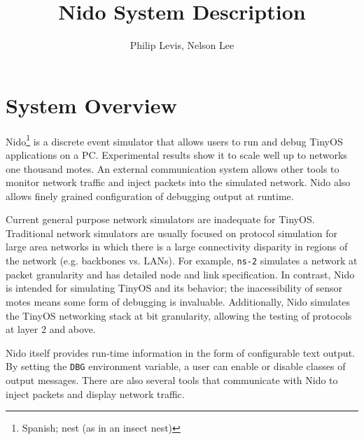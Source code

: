 \documentclass[10pt]{article}
\begin{document}
\fontsize{10}{10}                               %

\title{Nido System Description}
\author{Philip Levis, Nelson Lee}
\maketitle

\fontsize{10}{10}                               %

\section*{System Overview}

Nido\footnote{Spanish; nest (as in an insect nest)} is a discrete
event simulator that allows users to run and debug TinyOS applications
on a PC. Experimental results show it to scale well up to networks one
thousand motes. An external communication system allows other tools to
monitor network traffic and inject packets into the simulated
network. Nido also allows finely grained configuration of debugging
output at runtime.

Current general purpose network simulators are inadequate for
TinyOS. Traditional network simulators are usually focused on protocol
simulation for large area networks in which there is a large
connectivity disparity in regions of the network (e.g. backbones
vs. LANs). For example, {\tt ns-2} simulates a network at packet
granularity and has detailed node and link specification. In contrast,
Nido is intended for simulating TinyOS and its behavior; the
inacessibility of sensor motes means some form of debugging is
invaluable. Additionally, Nido simulates the TinyOS networking stack
at bit granularity, allowing the testing of protocols at layer 2 and
above.

Nido itself provides run-time information in the form of configurable
text output. By setting the {\tt DBG} environment variable, a user can
enable or disable classes of output messages. There are also several
tools that communicate with Nido to inject packets and display network
traffic.
\end{document}
